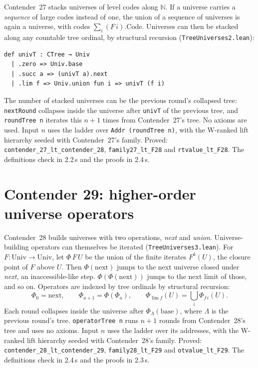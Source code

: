 \documentclass[11pt]{article}
\theoremstyle{definition}
\theoremstyle{remark}
\newcommand{\lean}[1]{\texttt{#1}}
\begin{document}
Contender~27 stacks universes of level codes along $\mathbb N$. If a universe
carries a \emph{sequence} of large codes instead of one, the union of a
sequence of universes is again a universe, with codes $\sum_i (F\,i).\mathrm{Code}$.
Universes can then be stacked along any countable tree ordinal, by structural
recursion (\lean{TreeUniverses2.lean}):
\begin{lstlisting}
def univT : CTree → Univ
  | .zero => Univ.base
  | .succ a => (univT a).next
  | .lim f => Univ.union fun i => univT (f i)
\end{lstlisting}
The number of stacked universes can be the previous round's collapsed tree:
\lean{nextRound} collapses inside the universe after \lean{univT} of the previous tree, and
\lean{roundTree n} iterates this $n{+}1$ times from Contender~27's tree.
No axioms are used. Input $n$ uses the ladder over \lean{Addr (roundTree n)},
with the W-ranked lift hierarchy seeded with Contender~27's family. Proved:
\lean{contender\_27\_lt\_\allowbreak contender\_28}, \lean{family27\_lt\_F28} and
\lean{rtvalue\_lt\_F28}. The definitions check in 2.2\,s and the proofs in 2.4\,s.

\section{Contender 29: higher-order universe operators}

Contender~28 builds universes with two operations, \emph{next} and
\emph{union}. Universe-building operators can themselves be iterated
(\lean{TreeUniverses3.lean}). For $F:\mathrm{Univ}\to\mathrm{Univ}$, let
$\Phi\,F\,U$ be the union of the finite iterates $F^k(U)$, the closure point of
$F$ above $U$. Then $\Phi(\mathrm{next})$ jumps to the next universe closed
under \emph{next}, an inaccessible-like step. $\Phi(\Phi(\mathrm{next}))$ jumps
to the next limit of those, and so on. Operators are indexed by tree ordinals by
structural recursion:
\[
\Phi_0=\mathrm{next},\qquad \Phi_{a+1}=\Phi(\Phi_a),\qquad
\Phi_{\lim f}(U)=\textstyle\bigcup_i \Phi_{f\,i}(U).
\]
Each round collapses inside the universe after $\Phi_\Lambda(\mathrm{base})$,
where $\Lambda$ is the previous round's tree. \lean{operatorTree n} runs $n{+}1$
rounds from Contender~28's tree and uses no axioms. Input $n$ uses the ladder over
its addresses, with the W-ranked lift hierarchy seeded with Contender~28's
family. Proved: \lean{contender\_28\_lt\_\allowbreak contender\_29},
\lean{family28\_lt\_F29} and \lean{otvalue\_lt\_F29}. The definitions check in
2.4\,s and the proofs in 2.3\,s.
\end{document}
